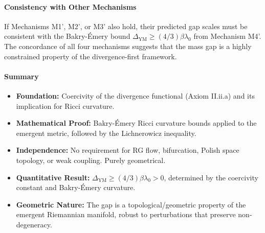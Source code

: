 \paragraph{Consistency with Other Mechanisms}

If Mechanisms M1', M2', or M3' also hold, their predicted gap scales must be consistent with the Bakry-Émery bound $\Delta_{\text{YM}} \geq (4/3) \beta \lambda_0$ from Mechanism M4'. The concordance of all four mechanisms suggests that the mass gap is a highly constrained property of the divergence-first framework.

\paragraph{Summary}

\begin{itemize}

\item \textbf{Foundation:} Coercivity of the divergence functional (Axiom II.ii.a) and its implication for Ricci curvature.

\item \textbf{Mathematical Proof:} Bakry-Émery Ricci curvature bounds applied to the emergent metric, followed by the Lichnerowicz inequality.

\item \textbf{Independence:} No requirement for RG flow, bifurcation, Polish space topology, or weak coupling. Purely geometrical.

\item \textbf{Quantitative Result:} $\Delta_{\text{YM}} \geq (4/3) \beta \lambda_0 > 0$, determined by the coercivity constant and Bakry-Émery curvature.

\item \textbf{Geometric Nature:} The gap is a topological/geometric property of the emergent Riemannian manifold, robust to perturbations that preserve non-degeneracy.

\end{itemize}

